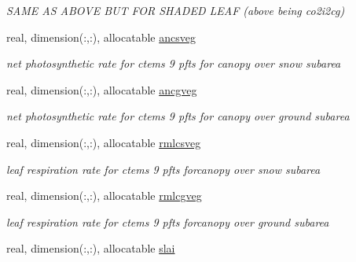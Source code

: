 \begin{DoxyCompactItemize}
\begin{DoxyCompactList}\small\item\em S\+A\+M\+E A\+S A\+B\+O\+V\+E B\+U\+T F\+O\+R S\+H\+A\+D\+E\+D L\+E\+A\+F (above being co2i2cg) \end{DoxyCompactList}\item 
\hypertarget{structctem__statevars_1_1veg__gat_aa1085f84025de40354de942f54dc1dca}{}real, dimension(\+:,\+:), allocatable \hyperlink{structctem__statevars_1_1veg__gat_aa1085f84025de40354de942f54dc1dca}{ancsveg}\label{structctem__statevars_1_1veg__gat_aa1085f84025de40354de942f54dc1dca}

\begin{DoxyCompactList}\small\item\em net photosynthetic rate for ctems 9 pfts for canopy over snow subarea \end{DoxyCompactList}\item 
\hypertarget{structctem__statevars_1_1veg__gat_a46d22af43c838443e5effee35058f3be}{}real, dimension(\+:,\+:), allocatable \hyperlink{structctem__statevars_1_1veg__gat_a46d22af43c838443e5effee35058f3be}{ancgveg}\label{structctem__statevars_1_1veg__gat_a46d22af43c838443e5effee35058f3be}

\begin{DoxyCompactList}\small\item\em net photosynthetic rate for ctems 9 pfts for canopy over ground subarea \end{DoxyCompactList}\item 
\hypertarget{structctem__statevars_1_1veg__gat_a2ae371cd07c26c25be3af7d03ffe0b33}{}real, dimension(\+:,\+:), allocatable \hyperlink{structctem__statevars_1_1veg__gat_a2ae371cd07c26c25be3af7d03ffe0b33}{rmlcsveg}\label{structctem__statevars_1_1veg__gat_a2ae371cd07c26c25be3af7d03ffe0b33}

\begin{DoxyCompactList}\small\item\em leaf respiration rate for ctems 9 pfts forcanopy over snow subarea \end{DoxyCompactList}\item 
\hypertarget{structctem__statevars_1_1veg__gat_ac7288d4b3196e658d159e65862699eb8}{}real, dimension(\+:,\+:), allocatable \hyperlink{structctem__statevars_1_1veg__gat_ac7288d4b3196e658d159e65862699eb8}{rmlcgveg}\label{structctem__statevars_1_1veg__gat_ac7288d4b3196e658d159e65862699eb8}

\begin{DoxyCompactList}\small\item\em leaf respiration rate for ctems 9 pfts forcanopy over ground subarea \end{DoxyCompactList}\item 
\hypertarget{structctem__statevars_1_1veg__gat_a7686062d379d2d3daf042fd9ab7f3c4f}{}real, dimension(\+:,\+:), allocatable \hyperlink{structctem__statevars_1_1veg__gat_a7686062d379d2d3daf042fd9ab7f3c4f}{slai}\label{structctem__statevars_1_1veg__gat_a7686062d379d2d3daf042fd9ab7f3c4f}


\end{DoxyCompactItemize}
